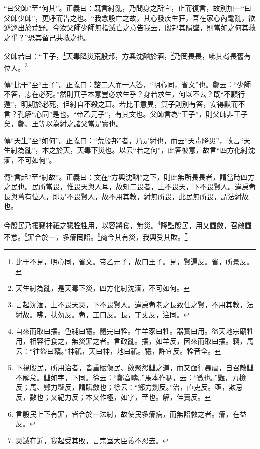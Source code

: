 {\noindent\shu{}\fzkt “曰父師”至“何其”。正義曰：既言紂亂，乃問身之所宜，止而復言，故別加一“曰父師少師”，更呼而告之也。“我念殷亡之故，其心發疾生狂，吾在家心內耄亂，欲遜遯出於荒野。今汝父師少師無指滅亡之意告我云，殷邦其隕墜，則當如之何其救之乎？”恐其留己共救之也。 \par}

父師若曰：“王子，\footnote{比干不見，明心同，省文。帝乙元子，故曰王子。見，賢遍反。省，所景反。}天毒降災荒殷邦，方興沈酗於酒，\footnote{天生紂為亂，是天毒下災，四方化紂沈湎，不可如何。}乃罔畏畏，咈其耇長舊有位人。\footnote{言起沈湎，上不畏天災，下不畏賢人。違戾耇老之長致仕之賢，不用其教，法紂故。咈，扶勿反。耇，工口反。長，丁丈反，注同。}


{\noindent\zhuan{}\fzbyks 傳“比干”至“王子”。正義曰：諮二人而一人答，“明心同，省文”也。鄭云：“少師不答，志在必死。”然則箕子本意豈必求生乎？身若求生，何以不去？既“不顧行遁”，明期於必死，但紂自不殺之耳。若比干意異，箕子則別有答，安得默而不言？孔解“心同”是也。“帝乙元子”，有其文也。父師言為“王子”，則父師非王子矣，鄭、王等以為紂之諸父當是實也。 \par}

{\noindent\zhuan{}\fzbyks 傳“天生”至“如何”。正義曰：“荒殷邦”者，乃是紂也，而云“天毒降災”，故言“天生紂為亂”，本之於天，天毒下災也。以云“若之何”，此答彼意，故言“四方化紂沈湎，不可如何”。 \par}

{\noindent\zhuan{}\fzbyks 傳“言起”至“紂故”。正義曰：文在“方興沈酗”之下，則此無所畏畏者，謂當時四方之民也。民所當畏，惟畏天與人耳，故知二畏者，上不畏天，下不畏賢人。違戾耇長與舊有位人，即是不畏賢人，故不用其教，紂無所畏，此民無所畏，謂法紂故也。 \par}

今殷民乃攘竊神祇之犧牷牲用，以容將食，無災。\footnote{自來而取曰攘。色純曰犧。體完曰牷。牛羊豕曰牲。器實曰用。盜天地宗廟牲用，相容行食之，無災罪之者。言政亂。攘，如羊反，因來而取曰攘。竊，馬云：“往盜曰竊。”神祇，天曰神，地曰祇。犧，許宜反。牷音全。}降監殷民，用乂讎斂，召敵讎不怠。\footnote{下視殷民，所用治者，皆重賦傷民、斂聚怨讎之道，而又亟行暴虐，自召敵讎不解怠。讎如字，下同。徐云：“鄭音疇。”馬本作稠，云：“數也。”豔，力檢反；馬、鄭力豔反，謂賦斂也；徐云：“鄭力劍反。”治，直吏反。亟，欺忌反，數也；又紀力反；本又作極，如字，至也。解，佳賣反。}罪合於一，多瘠罔詔。\footnote{言殷民上下有罪，皆合於一法紂，故使民多瘠病，而無詔救之者。瘠，在益反。}商今其有災，我興受其敗。\footnote{災滅在近，我起受其敗，言宗室大臣義不忍去。}


